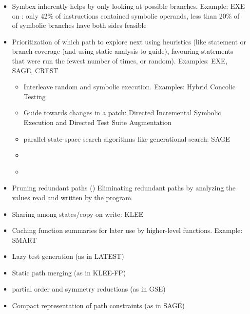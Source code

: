 \documentclass{article}
\begin{document}
\begin{itemize}
    \item Symbex inherently helps by only looking at possible branches. Example: EXE\cite{EXE} on : only 42\% of instructions contained symbolic operands, less than 20\% of of symbolic branches have both sides feasible\cite{EXE}
    \item Prioritization of which path to explore next using heuristics (like statement or branch coverage (and using static analysis to guide), favouring statements that were run the fewest number of times, or random). Examples: EXE\cite{EXE}, SAGE\cite{SAGE}, CREST\cite{CREST}
          \begin{itemize}
              \item Interleave random and symbolic execution. Examples: Hybrid Concolic Testing\cite{HCT}
              \item Guide towards changes in a patch: Directed Incremental Symbolic Execution\cite{DiSE} and Directed Test Suite Augmentation\cite{DTSA}
              \item parallel state-space search algorithms like generational search: SAGE\cite{SAGE}
              \item {}\cite{ReviewThreeDecades}
              \item {}\cite{Fitnex}
          \end{itemize}
    \item Pruning redundant paths (\cite{RWset}) Eliminating redundant paths by analyzing the values read and written by the program.
    \item Sharing among states/copy on write: KLEE\cite{KLEE}
    \item Caching function summaries for later use by higher-level functions. Example: SMART\cite{SMART}
    \item Lazy test generation (as in LATEST\cite{LATEST})
    \item Static path merging (as in KLEE-FP\cite{KLEEFP})
    \item partial order and symmetry reductions (as in GSE\cite{GSE})
    \item Compact representation of path constraints (as in SAGE\cite{SAGE})
\end{itemize}
\end{document}
